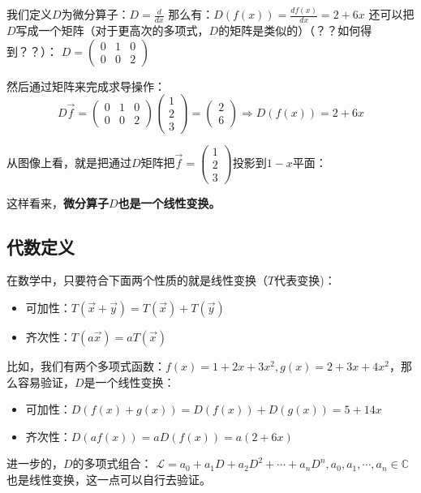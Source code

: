 \documentclass[12pt]{article}
\begin{document}
我们定义$D$为微分算子：$D=\frac{d}{dx}$
那么有：$D(f(x))=\frac{df(x)}{dx}=2+6x$
还可以把$D$写成一个矩阵（对于更高次的多项式，$D$的矩阵是类似的）（？？如何得到？？）：
$D=\begin{pmatrix}0&1&0\\0&0&2\end{pmatrix}$

然后通过矩阵来完成求导操作：
$$
D\vec{f_{}}=
\begin{pmatrix}0&1&0\\0&0&2\end{pmatrix}\begin{pmatrix}1\\2\\3\end{pmatrix}=\begin{pmatrix}2\\6\end{pmatrix} \Rightarrow D(f(x))=2+6x
$$

从图像上看，就是把通过$D$矩阵把$\vec{f_{}}=\begin{pmatrix}1\\2\\3\end{pmatrix}$投影到$1-x$平面：

这样看来，\textbf{微分算子$D$也是一个线性变换。}

\subsection{代数定义}
在数学中，只要符合下面两个性质的就是线性变换（$T$代表变换)：
\begin{itemize}
\setlength{\itemsep}{0pt}
\setlength{\parsep}{0pt}
\setlength{\parskip}{0pt}
    \item 可加性：$T(\vec{x_{}}+\vec{y_{}})=T(\vec{x_{}})+T(\vec{y_{}})$
    \item 齐次性：$T(a\vec{x_{}})=aT(\vec{x_{}})$
\end{itemize}

比如，我们有两个多项式函数：$f(x)=1+2x+3x^2, g(x)=2+3x+4x^2$，那么容易验证，$D$是一个线性变换：
\begin{itemize}
\setlength{\itemsep}{0pt}
\setlength{\parsep}{0pt}
\setlength{\parskip}{0pt}
    \item 可加性：$D(f(x)+g(x))=D(f(x))+D(g(x))=5+14x$
    \item 齐次性：$D(af(x))=aD(f(x))=a(2+6x)$
\end{itemize}


进一步的，$D$的多项式组合：
$\mathcal{L}=a_0+a_1D+a_2D^2+\cdots+a_nD^n,a_0,a_1,\cdots,a_n\in\mathbb{C}$
也是线性变换，这一点可以自行去验证。
\end{document}
